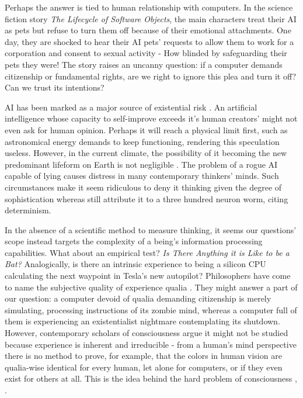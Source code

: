 \documentclass[12pt]{olplainarticle}
\begin{document}
Perhaps the answer is tied to human relationship with computers. In the science fiction story \textit{The Lifecycle of Software Objects}, the main characters treat their AI as pets but refuse to turn them off because of their emotional attachments. One day, they are shocked to hear their AI pets' requests to allow them to work for a corporation and consent to sexual activity \cite{chiang2010lifecycle} - How blinded by safeguarding their pets they were! The story raises an uncanny question: if a computer demands citizenship or fundamental rights, are we right to ignore this plea and turn it off? Can we trust its intentions?

AI has been marked as a major source of existential risk \cite{bostrom2002existential}. An artificial intelligence whose capacity to self-improve exceeds it's human creators' might not even ask for human opinion. Perhaps it will reach a physical limit first, such as astronomical energy demands to keep functioning, rendering this speculation useless. However, in the current climate, the possibility of it becoming the new predominant lifeform on Earth is not negligible \cite{bostrom2017superintelligence}. The problem of a rogue AI capable of lying causes distress in many contemporary thinkers' minds. Such circumstances make it seem ridiculous to deny it thinking given the degree of sophistication whereas still attribute it to a three hundred neuron worm, citing determinism.

In the absence of a scientific method to measure thinking, it seems our questions' scope instead targets the complexity of a being's information processing capabilities. What about an empirical test? \textit{Is There Anything it is Like to be a Bat?} Analogically, is there an intrinsic experience to being a silicon CPU calculating the next waypoint in Tesla's new autopilot? Philosophers have come to name the subjective quality of experience qualia \cite{jackson1982epiphenomenal}. They might answer a part of our question: a computer devoid of qualia demanding citizenship is merely simulating, processing instructions of its zombie mind, whereas a computer full of them is experiencing an existentialist nightmare contemplating its shutdown. However, contemporary scholars of consciousness argue it might not be studied because experience is inherent and irreducible - from a human's mind perspective there is no method to prove, for example, that the colors in human vision are qualia-wise identical for every human, let alone for computers, or if they even exist for others at all. This is the idea behind the hard problem of consciousness \cite{chalmers1995facing}, \cite{hacker2002there}.
\end{document}
